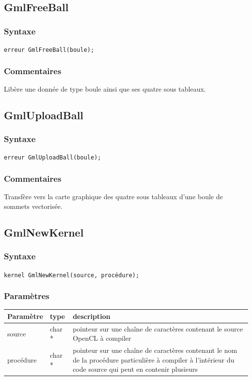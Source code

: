 \documentclass[a4paper,12pt]{article}
\begin{document}
\subsection{GmlFreeBall}
\subsubsection*{Syntaxe}
{\tt erreur GmlFreeBall(boule);}
\subsubsection*{Commentaires}
Libère une donnée de type boule ainsi que ses quatre sous tableaux.


\subsection{GmlUploadBall}
\subsubsection*{Syntaxe}
{\tt erreur GmlUploadBall(boule);}
\subsubsection*{Commentaires}
Transfère vers la carte graphique des quatre sous tableaux d'une boule de sommets vectorisée.


\subsection{GmlNewKernel}
\subsubsection*{Syntaxe}
{\tt kernel GmlNewKernel(source, procédure);}
\subsubsection*{Paramètres}

\begin{tabular}{|m{2cm}|m{1.5cm}|m{10.5cm}|}
\hline
Paramètre  & type   & description \\
\hline
source     & char * & pointeur sur une chaîne de caractères contenant le source  OpenCL à compiler \\
\hline
procédure  & char * & pointeur sur une chaîne de caractères contenant le nom de la procédure particulière à compiler à l'intérieur du code source qui peut en contenir plusieurs \\
\hline
\end{tabular}
\end{document}
